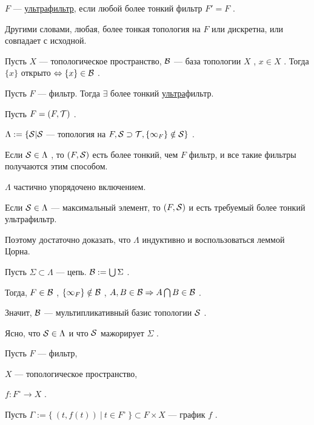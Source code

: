 \SSsect[def] \( F \) --- \underline{ультрафильтр}, если любой более тонкий фильтр \( F' = F \) .

Другими словами, любая, более тонкая топология на \( F\) или дискретна, или совпадает с исходной.

\SSsect Пусть \( X \) --- топологическое пространство, \( \mathcal{B} \) --- база топологии \( X \) , \( x \in X \) . Тогда \( \{x\} \) открыто \( \Leftrightarrow \{x\} \in \mathcal{B} \) . 

\SSsect[!] Пусть \( F \) --- фильтр. Тогда \( \exists \) более тонкий \underline{ультра}фильтр.

\SSproof

Пусть \( F = (F,\mathcal{T}) \) .

\( \Lambda := \{ \mathcal{S} | \mathcal{S} \) --- топология на \( F, \mathcal{S} \supset \mathcal{T} , \{\infty_F\} \notin \mathcal{S} \} \) .

Если \( \mathcal{S} \in \Lambda \) , то \( (F,\mathcal{S}) \) есть более тонкий, чем \( F \) фильтр, и все такие фильтры получаются этим способом.

\( \Lambda \) частично упорядочено включением.

Если \( \mathcal{S} \in \Lambda \) --- максимальный элемент, то \( (F,\mathcal{S}) \) и есть требуемый более тонкий ультрафильтр.

Поэтому достаточно доказать, что \( \Lambda \) индуктивно и воспользоваться леммой Цорна.

Пусть \( \Sigma \subset \Lambda \) --- цепь. \( \mathcal{B} := \bigcup \Sigma \) .

Тогда, \( F \in \mathcal{B} \) , \( \{\infty_F\} \notin \mathcal{B} \) , \( A,B \in \mathcal{B}  \Rightarrow A \bigcap B \in \mathcal{B} \) .

Значит, \( \mathcal{B} \) --- мультипликативный базис топологии \( \mathcal{S} \) .

Ясно, что \( \mathcal{S} \in \Lambda \) и что \( \mathcal{S} \) мажорирует \( \Sigma \) .

\SSendp

\pagebreak

\SSbullet 

\vspace

\begin{center}
Пусть \( F \) --- фильтр,

\( X \) --- топологическое пространство,

\( f: F^\circ \rightarrow X \) .
\end{center}

\SSsect Пусть \( \Gamma := \{~ (t,f(t)) ~|~ t \in F^\circ ~\} \subset F \times X \) --- график \( f \) .

